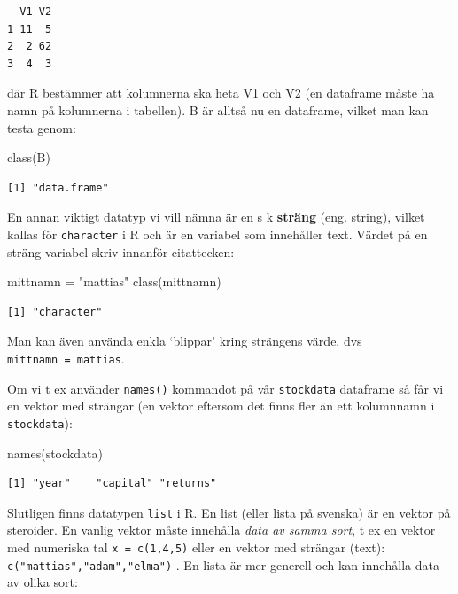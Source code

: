 \documentclass[
  letterpaper,
  DIV=11,
  numbers=noendperiod,
  oneside]{scrartcl}
\newenvironment{Shaded}{\begin{snugshade}}{\end{snugshade}}
\newcommand{\FunctionTok}[1]{\textcolor[rgb]{0.28,0.35,0.67}{#1}}
\newcommand{\NormalTok}[1]{\textcolor[rgb]{0.00,0.23,0.31}{#1}}
\newcommand{\OtherTok}[1]{\textcolor[rgb]{0.00,0.23,0.31}{#1}}
\newcommand{\StringTok}[1]{\textcolor[rgb]{0.13,0.47,0.30}{#1}}
\begin{document}
\begin{verbatim}
  V1 V2
1 11  5
2  2 62
3  4  3
\end{verbatim}

där R bestämmer att kolumnerna ska heta V1 och V2 (en dataframe måste ha
namn på kolumnerna i tabellen). B är alltså nu en dataframe, vilket man
kan testa genom:

\begin{Shaded}
\begin{Highlighting}[]
\FunctionTok{class}\NormalTok{(B)}
\end{Highlighting}
\end{Shaded}

\begin{verbatim}
[1] "data.frame"
\end{verbatim}

En annan viktigt datatyp vi vill nämna är en s k \textbf{sträng} (eng.
string), vilket kallas för \texttt{character} i R och är en variabel som
innehåller text. Värdet på en sträng-variabel skriv innanför
citattecken:

\begin{Shaded}
\begin{Highlighting}[]
\NormalTok{mittnamn }\OtherTok{=} \StringTok{"mattias"}
\FunctionTok{class}\NormalTok{(mittnamn)}
\end{Highlighting}
\end{Shaded}

\begin{verbatim}
[1] "character"
\end{verbatim}

Man kan även använda enkla `blippar' kring strängens värde, dvs
\texttt{mittnamn\ =\ \textquotesingle{}mattias\textquotesingle{}}.

Om vi t ex använder \texttt{names()} kommandot på vår \texttt{stockdata}
dataframe så får vi en vektor med strängar (en vektor eftersom det finns
fler än ett kolumnnamn i \texttt{stockdata}):

\begin{Shaded}
\begin{Highlighting}[]
\FunctionTok{names}\NormalTok{(stockdata)}
\end{Highlighting}
\end{Shaded}

\begin{verbatim}
[1] "year"    "capital" "returns"
\end{verbatim}

Slutligen finns datatypen \texttt{list} i R. En list (eller lista på
svenska) är en vektor på steroider. En vanlig vektor måste innehålla
\emph{data av samma sort}, t ex en vektor med numeriska tal
\texttt{x\ =\ c(1,4,5)} eller en vektor med strängar (text):
\texttt{c("mattias","adam","elma")} . En lista är mer generell och kan
innehålla data av olika sort:
\end{document}
